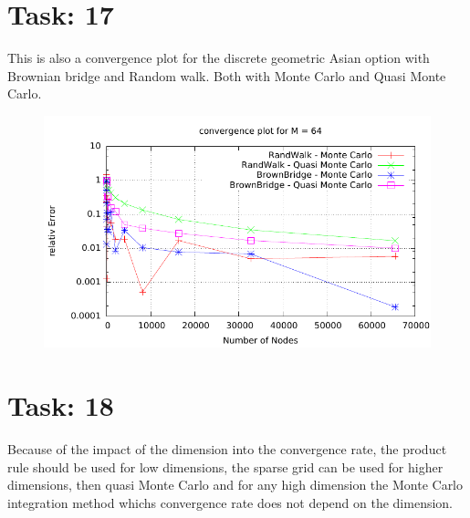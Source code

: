 \documentclass{article}
\begin{document}
\section*{Task: 17}
This is also a convergence plot for the discrete geometric Asian option with Brownian bridge and Random walk. Both with Monte Carlo and Quasi Monte Carlo.
\begin{figure}[htbp]
  \centering
     \includegraphics[width=1.0\textwidth]{../Task17/sh3_task17_convergencePlot.pdf}
\end{figure}

\newpage

\section*{Task: 18}

Because of the impact of the dimension into the convergence rate, 
the product rule should be used for low dimensions, 
the sparse grid can be used for higher dimensions, then quasi Monte Carlo and
for any high dimension the Monte Carlo integration method whichs convergence rate does not depend on the dimension. 
\end{document}
